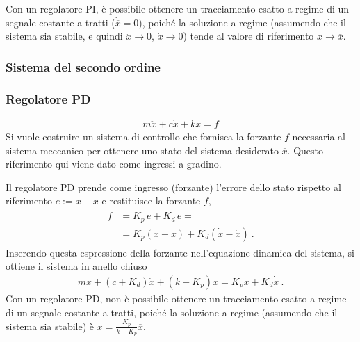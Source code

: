 \documentclass[letterpaper,10pt,italian]{jupyterBook}
\begin{document}
\sphinxAtStartPar
{} Con un regolatore PI, è possibile ottenere un tracciamento esatto a regime di un segnale costante a tratti (\(\dot{\overline{x}} = 0\)), poiché la soluzione a regime (assumendo che il sistema sia stabile, e quindi \(\ddot{x} \rightarrow 0\), \(\dot{x} \rightarrow 0\)) tende al valore di riferimento \(x \rightarrow \overline{x}\).


\subsubsection{Sistema del secondo ordine}
\label{\detokenize{ch/control-intro:sistema-del-secondo-ordine}}\label{\detokenize{ch/control-intro:control-hs-intro-examples-second-order}}\subsubsection*{Regolatore PD}
\begin{equation*}
\begin{split}m \ddot{x} + c \dot{x} + k x = f\end{split}
\end{equation*}
\sphinxAtStartPar
Si vuole costruire un sistema di controllo che fornisca la forzante \(f\) necessaria al sistema meccanico per ottenere uno stato del sistema desiderato \(\overline{x}\). Questo riferimento qui viene dato come ingressi a gradino.

\sphinxAtStartPar
Il regolatore PD prende come ingresso (forzante) l’errore dello stato rispetto al riferimento \(e := \overline{x} - x\) e restituisce la forzante \(f\),
\begin{equation*}
\begin{split}\begin{aligned}
  f & = K_p \, e + K_d \, \dot{e} = \\
    & = K_p ( \overline{x} - x ) + K_d \left( \dot{\overline{x}} - \dot{x} \right)  \ .
\end{aligned}\end{split}
\end{equation*}
\sphinxAtStartPar
Inserendo questa espressione della forzante nell’equazione dinamica del sistema, si ottiene il sistema in anello chiuso
\begin{equation*}
\begin{split}m \ddot{x} + \left( c + K_d \right) \dot{x} + \left( k + K_p \right) x = K_p \overline{x} + K_d \dot{\overline{x}} \ .\end{split}
\end{equation*}
\sphinxAtStartPar
{} Con un regolatore PD, non è possibile ottenere un tracciamento esatto a regime di un segnale costante a tratti, poiché la soluzione a regime (assumendo che il sistema sia stabile) è \(x = \frac{K_p}{k + K_p} \overline{x}\).
\end{document}
